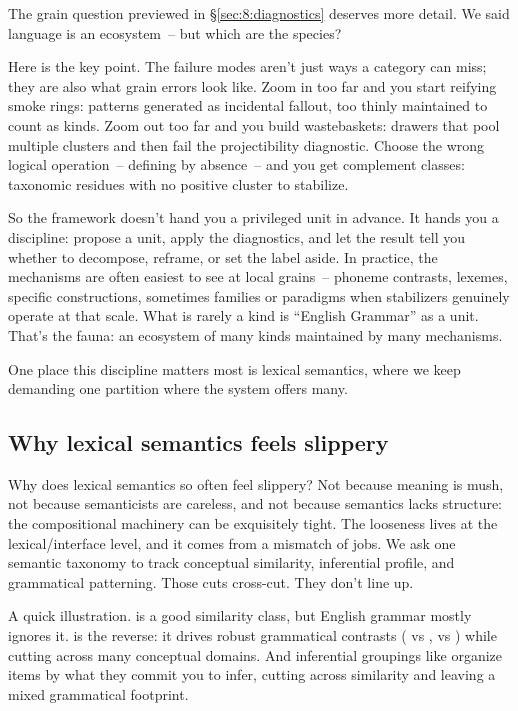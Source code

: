 The grain question previewed in §\ref{sec:8:diagnostics} deserves more detail. We said language is an ecosystem~-- but which are the species?

Here is the key point. The failure modes aren't just ways a category can miss; they are also what grain errors look like. Zoom in too far and you start reifying smoke rings: patterns generated as incidental fallout, too thinly maintained to count as kinds. Zoom out too far and you build wastebaskets: drawers that pool multiple clusters and then fail the projectibility diagnostic. Choose the wrong logical operation~-- defining by absence~-- and you get complement classes: taxonomic residues with no positive cluster to stabilize.

So the framework doesn't hand you a privileged unit in advance. It hands you a discipline: propose a unit, apply the diagnostics, and let the result tell you whether to decompose, reframe, or set the label aside. In practice, the mechanisms are often easiest to see at local grains~-- phoneme contrasts, lexemes, specific constructions, sometimes families or paradigms when stabilizers genuinely operate at that scale. What is rarely a kind is \enquote{English Grammar} as a unit. That's the fauna: an ecosystem of many kinds maintained by many mechanisms.

One place this discipline matters most is lexical semantics, where we keep demanding one partition where the system offers many.

\subsection{Why lexical semantics feels slippery}
\label{sec:8:lexical-semantics}

Why does lexical semantics so often feel slippery? Not because meaning is mush, not because semanticists are careless, and not because semantics lacks structure: the compositional machinery can be exquisitely tight. The looseness lives at the lexical/interface level, and it comes from a mismatch of jobs. We ask one semantic taxonomy to track conceptual similarity, inferential profile, and grammatical patterning. Those cuts cross-cut. They don't line up.

A quick illustration.  is a good similarity class, but English grammar mostly ignores it.  is the reverse: it drives robust grammatical contrasts ( vs ,  vs ) while cutting across many conceptual domains. And inferential groupings like  organize items by what they commit you to infer, cutting across similarity and leaving a mixed grammatical footprint.

